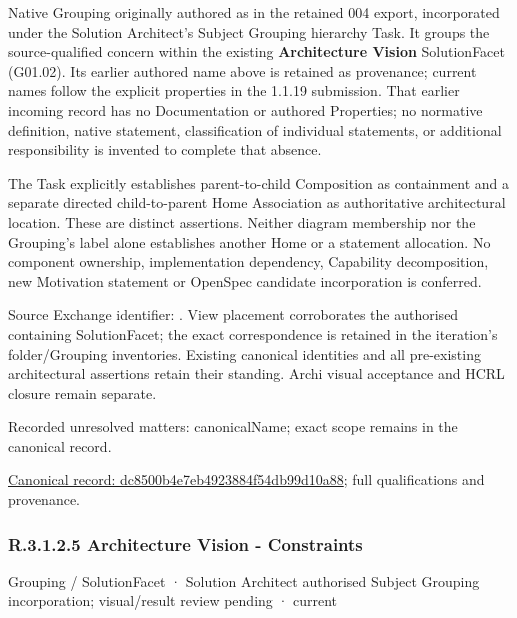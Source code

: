 Native Grouping originally authored as \texttt{} in the retained 004 export,
incorporated under the Solution Architect's Subject Grouping hierarchy Task.
It groups the source-qualified \texttt{} concern within
the existing \textbf{Architecture Vision} SolutionFacet (G01.02). Its earlier authored name above is retained as provenance; current names
follow the explicit properties in the 1.1.19 submission.
That earlier incoming record has no Documentation or authored Properties; no normative
definition, native statement, classification of individual statements, or
additional responsibility is invented to complete that absence.



The Task explicitly establishes parent-to-child Composition as containment and
a separate directed child-to-parent Home Association as authoritative architectural
location. These are distinct assertions. Neither diagram membership nor the
Grouping's label alone establishes another Home or a statement allocation.
No component ownership, implementation dependency, Capability decomposition,
new Motivation statement or OpenSpec candidate incorporation is conferred.



Source Exchange identifier: \texttt{}. View placement corroborates
the authorised containing SolutionFacet; the exact correspondence is retained in the
iteration's folder/Grouping inventories. Existing canonical identities and all
pre-existing architectural assertions retain their standing. Archi visual
acceptance and HCRL closure remain separate.


{\small Recorded unresolved matters: canonicalName; exact scope remains in the canonical record.}\par
{\footnotesize \href{../../../../../../../continuum/grouping/dc8500b4e7eb4923884f54db99d10a88.md}{Canonical record: dc8500b4e7eb4923884f54db99d10a88}; full qualifications and provenance.}\par
\subsubsection*{R.3.1.2.5 Architecture Vision - Constraints}
\label{navigation:R.3.1.2.5}

\label{element:54d5ba1ccaae46c8b372f7ccfca99741}
{\small Grouping / SolutionFacet · Solution Architect authorised Subject Grouping incorporation; visual/result review pending · current}\par

